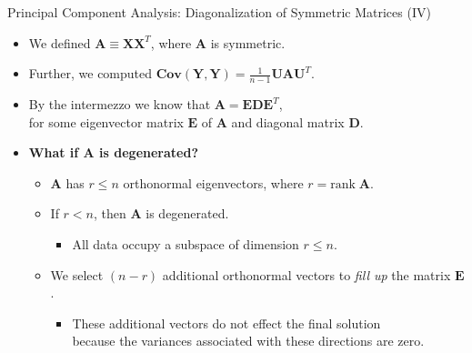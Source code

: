 \begin{frame}{Principal Component Analysis: Diagonalization of Symmetric 
Matrices (IV)}
	\begin{itemize}
		\item We defined $\mathbf{A} \equiv \mathbf{X}\mathbf{X}^T$, where 
		$\mathbf{A}$ is symmetric.
		\item Further, we computed $\textbf{Cov}(\mathbf{Y},\mathbf{Y}) = 
		\frac{1}{n-1} \mathbf{UAU}^T$.
		\item By the intermezzo we know that $\mathbf{A} = \mathbf{EDE}^T$, \\
		for some eigenvector matrix $\mathbf{E}$ of $\mathbf{A}$ and diagonal 
		matrix $\mathbf{D}$.
		\item \textbf{What if $\mathbf{A}$ is degenerated?}
		\begin{itemize}
			\item $\mathbf{A}$ has $r \leq n$ orthonormal eigenvectors, where 
			$r = \text{rank} \; \mathbf{A}$.
			\item If $r < n$, then $\mathbf{A}$ is degenerated.
			\begin{itemize}
				\item All data occupy a subspace of dimension $r \leq n$.
			\end{itemize}
			\item We select $(n-r)$ additional orthonormal vectors to 
			\emph{fill up} the matrix $\mathbf{E}$.
			\begin{itemize}
				\item These additional vectors do not effect the final solution 
				\\
				because the variances associated with these directions are zero.
			\end{itemize}
		\end{itemize}
	\end{itemize}
\end{frame}

